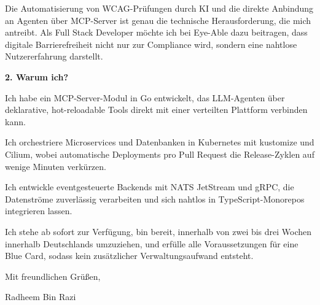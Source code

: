 \documentclass[11pt,a4paper]{coverletter}
\begin{document}
Die Automatisierung von WCAG-Prüfungen durch KI und die direkte Anbindung an Agenten über MCP-Server ist genau die technische Herausforderung, die mich antreibt. Als Full Stack Developer möchte ich bei Eye-Able dazu beitragen, dass digitale Barrierefreiheit nicht nur zur Compliance wird, sondern eine nahtlose Nutzererfahrung darstellt.

\vspace{8pt}\noindent\textbf{2. Warum ich?}\par\vspace{3pt}

\bullets

  \item Ich habe ein MCP-Server-Modul in Go entwickelt, das LLM-Agenten über deklarative, hot-reloadable Tools direkt mit einer verteilten Plattform verbinden kann.

  \item Ich orchestriere Microservices und Datenbanken in Kubernetes mit kustomize und Cilium, wobei automatische Deployments pro Pull Request die Release-Zyklen auf wenige Minuten verkürzen.

  \item Ich entwickle eventgesteuerte Backends mit NATS JetStream und gRPC, die Datenströme zuverlässig verarbeiten und sich nahtlos in TypeScript-Monorepos integrieren lassen.

\bulletsend

Ich stehe ab sofort zur Verfügung, bin bereit, innerhalb von zwei bis drei Wochen innerhalb Deutschlands umzuziehen, und erfülle alle Voraussetzungen für eine Blue Card, sodass kein zusätzlicher Verwaltungsaufwand entsteht.

\closing{Mit freundlichen Grüßen,}{Radheem Bin Razi}
\end{document}
